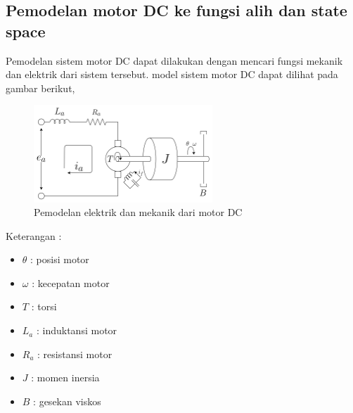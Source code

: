 \documentclass[../cover.tex]{subfiles}
\begin{document}
    \subsection{Pemodelan motor DC ke fungsi alih dan state space}
        Pemodelan sistem motor DC dapat dilakukan dengan mencari fungsi mekanik dan elektrik dari sistem tersebut. model sistem motor DC dapat dilihat pada gambar berikut,
        \begin{figure}[H]
            \centering
            \includegraphics[width = 0.6\textwidth]{assets/image/pemodelan_motor.png}
            \caption{Pemodelan elektrik dan mekanik dari motor DC}
            \label{gambar_3}
        \end{figure}
        \begin{center}
        Keterangan :
            \begin{minipage}[c]{8cm}
                \begin{itemize}
                    \item $\theta$ : posisi motor
                    \item $\omega$ : kecepatan motor
                    \item $T$      : torsi
                    \item $L_a$    : induktansi motor
                    \item $R_a$    : resistansi motor
                    \item $J$      : momen inersia
                    \item $B$      : gesekan viskos
                \end{itemize}
            \end{minipage}
        \end{center}
\end{document}
